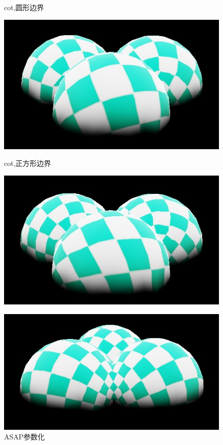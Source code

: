 \documentclass{article}
\begin{document}
	\begin{figure}[htbp]
		\centering
		\begin{minipage}{0.24\linewidth}
			\centering
			\caption{cot,圆形边界}
			\includegraphics[width=1\linewidth]{balls_circle_tex.JPG}
			\label{chutian1}%
		\end{minipage}
		\begin{minipage}{0.24\linewidth}
			\centering
			\caption{cot,正方形边界}
			\includegraphics[width=1\linewidth]{balls_square_tex.JPG}
			\label{chutian2}%
		\end{minipage}
		\begin{minipage}{0.24\linewidth}
			\centering
			\caption{ASAP参数化}
			\includegraphics[width=1\linewidth]{balls_asap_tex.JPG}

\end{minipage}
\end{figure}
\end{document}
